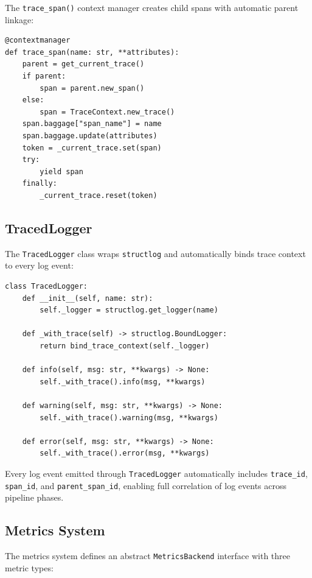\documentclass[11pt,a4paper]{article}
\theoremstyle{plain}
\theoremstyle{definition}
\begin{document}
The \texttt{trace\_span()} context manager creates child spans with automatic
parent linkage:

\begin{lstlisting}[style=pythonstyle, caption={trace\_span context manager from \texttt{observability.py}}]
@contextmanager
def trace_span(name: str, **attributes):
    parent = get_current_trace()
    if parent:
        span = parent.new_span()
    else:
        span = TraceContext.new_trace()
    span.baggage["span_name"] = name
    span.baggage.update(attributes)
    token = _current_trace.set(span)
    try:
        yield span
    finally:
        _current_trace.reset(token)
\end{lstlisting}

\subsection{TracedLogger}

The \texttt{TracedLogger} class wraps \texttt{structlog} and automatically
binds trace context to every log event:

\begin{lstlisting}[style=pythonstyle, caption={TracedLogger from \texttt{observability.py}}]
class TracedLogger:
    def __init__(self, name: str):
        self._logger = structlog.get_logger(name)

    def _with_trace(self) -> structlog.BoundLogger:
        return bind_trace_context(self._logger)

    def info(self, msg: str, **kwargs) -> None:
        self._with_trace().info(msg, **kwargs)

    def warning(self, msg: str, **kwargs) -> None:
        self._with_trace().warning(msg, **kwargs)

    def error(self, msg: str, **kwargs) -> None:
        self._with_trace().error(msg, **kwargs)
\end{lstlisting}

Every log event emitted through \texttt{TracedLogger} automatically includes
\texttt{trace\_id}, \texttt{span\_id}, and \texttt{parent\_span\_id}, enabling
full correlation of log events across pipeline phases.

\subsection{Metrics System}

The metrics system defines an abstract \texttt{MetricsBackend} interface with
three metric types:
\end{document}
